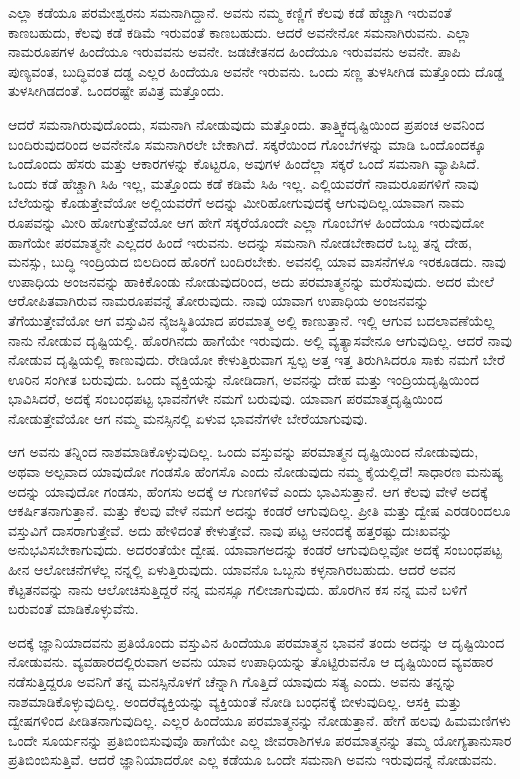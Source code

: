 ಎಲ್ಲಾ ಕಡೆಯೂ ಪರಮೇಶ್ವರನು ಸಮನಾಗಿದ್ದಾನೆ. ಅವನು ನಮ್ಮ ಕಣ್ಣಿಗೆ ಕೆಲವು ಕಡೆ ಹೆಚ್ಚಾಗಿ ಇರುವಂತೆ ಕಾಣಬಹುದು, ಕೆಲವು ಕಡೆ ಕಡಿಮೆ ಇರುವಂತೆ ಕಾಣಬಹುದು. ಆದರೆ ಅವನೇನೋ ಸಮನಾಗಿರುವನು. ಎಲ್ಲಾ ನಾಮರೂಪಗಳ ಹಿಂದೆಯೂ ಇರುವವನು ಅವನೇ. ಜಡಚೇತನದ ಹಿಂದೆಯೂ ಇರುವವನು ಅವನೇ. ಪಾಪಿ ಪುಣ್ಯವಂತ, ಬುದ್ಧಿವಂತ ದಡ್ಡ ಎಲ್ಲರ ಹಿಂದೆಯೂ ಅವನೇ ಇರುವನು. ಒಂದು ಸಣ್ಣ ತುಳಸೀಗಿಡ ಮತ್ತೊಂದು ದೊಡ್ಡ ತುಳಸೀಗಿಡದಂತೆ. ಒಂದರಷ್ಟೇ ಪವಿತ್ರ ಮತ್ತೊಂದು.

ಆದರೆ ಸಮನಾಗಿರುವುದೊಂದು, ಸಮನಾಗಿ ನೋಡುವುದು ಮತ್ತೊಂದು. ತಾತ್ತ್ವಿಕದೃಷ್ಟಿಯಿಂದ ಪ್ರಪಂಚ ಅವನಿಂದ ಬಂದಿರುವುದರಿಂದ ಅವನೇನೊ ಸಮನಾಗಿರಲೇ ಬೇಕಾಗಿದೆ. ಸಕ್ಕರೆಯಿಂದ ಗೊಂಬೆಗಳನ್ನು ಮಾಡಿ ಒಂದೊಂದಕ್ಕೂ ಒಂದೊಂದು ಹೆಸರು ಮತ್ತು ಆಕಾರಗಳನ್ನು ಕೊಟ್ಟರೂ, ಅವುಗಳ ಹಿಂದೆಲ್ಲಾ ಸಕ್ಕರೆ ಒಂದೆ ಸಮನಾಗಿ ವ್ಯಾಪಿಸಿದೆ. ಒಂದು ಕಡೆ ಹೆಚ್ಚಾಗಿ ಸಿಹಿ ಇಲ್ಲ, ಮತ್ತೊಂದು ಕಡೆ ಕಡಿಮೆ ಸಿಹಿ ಇಲ್ಲ. ಎಲ್ಲಿಯವರೆಗೆ ನಾಮರೂಪಗಳಿಗೆ ನಾವು ಬೆಲೆಯನ್ನು ಕೊಡುತ್ತೇವೆಯೋ ಅಲ್ಲಿಯವರೆಗೆ ಅದನ್ನು ಮೀರಿಹೋಗುವುದಕ್ಕೆ ಆಗುವುದಿಲ್ಲ.\break ಯಾವಾಗ ನಾಮ ರೂಪವನ್ನು ಮೀರಿ ಹೋಗುತ್ತೇವೆಯೋ ಆಗ ಹೇಗೆ ಸಕ್ಕರೆಯೊಂದೇ ಎಲ್ಲಾ ಗೊಂಬೆಗಳ ಹಿಂದೆಯೂ ಇರುವುದೋ ಹಾಗೆಯೇ ಪರಮಾತ್ಮನೇ ಎಲ್ಲದರ ಹಿಂದೆ ಇರುವನು. ಅದನ್ನು ಸಮನಾಗಿ ನೋಡಬೇಕಾದರೆ ಒಬ್ಬ ತನ್ನ ದೇಹ, ಮನಸ್ಸು, ಬುದ್ಧಿ ಇಂದ್ರಿಯದ ಬಿಲದಿಂದ ಹೊರಗೆ ಬಂದಿರಬೇಕು. ಅವನಲ್ಲಿ ಯಾವ ವಾಸನೆಗಳೂ ಇರಕೂಡದು. ನಾವು ಉಪಾಧಿಯ ಅಂಜನವನ್ನು ಹಾಕಿಕೊಂಡು ನೋಡುವುದರಿಂದ, ಅದು ಪರಮಾತ್ಮನನ್ನು ಮರೆಸುವುದು. ಅದರ ಮೇಲೆ ಆರೋಪಿತವಾಗಿರುವ ನಾಮರೂಪವನ್ನೆ ತೋರುವುದು. ನಾವು ಯಾವಾಗ ಉಪಾಧಿಯ ಅಂಜನವನ್ನು ತೆಗೆಯುತ್ತೇವೆಯೋ ಆಗ ವಸ್ತುವಿನ ನೈಜಸ್ಥಿತಿಯಾದ ಪರಮಾತ್ಮ ಅಲ್ಲಿ ಕಾಣುತ್ತಾನೆ. ಇಲ್ಲಿ ಆಗುವ ಬದಲಾವಣೆಯೆಲ್ಲ ನಾನು ನೋಡುವ ದೃಷ್ಟಿಯಲ್ಲಿ. ಹೊರಗಿನದು ಹಾಗೆಯೇ ಇರುವುದು. ಅಲ್ಲಿ ವ್ಯತ್ಯಾಸವೇನೂ ಆಗುವುದಿಲ್ಲ. ಆದರೆ ನಾವು ನೋಡುವ ದೃಷ್ಟಿಯಲ್ಲಿ ಕಾಣುವುದು. ರೇಡಿಯೋ ಕೇಳುತ್ತಿರುವಾಗ ಸ್ವಲ್ಪ ಅತ್ತ ಇತ್ತ ತಿರುಗಿಸಿದರೂ ಸಾಕು ನಮಗೆ ಬೇರೆ ಊರಿನ ಸಂಗೀತ ಬರುವುದು. ಒಂದು ವ್ಯಕ್ತಿಯನ್ನು ನೋಡಿದಾಗ, ಅವನನ್ನು ದೇಹ ಮತ್ತು ಇಂದ್ರಿಯದೃಷ್ಟಿಯಿಂದ ಭಾವಿಸಿದರೆ, ಅದಕ್ಕೆ ಸಂಬಂಧಪಟ್ಟ ಭಾವನೆಗಳೇ ನಮಗೆ ಬರುವುವು. ಯಾವಾಗ ಪರಮಾತ್ಮದೃಷ್ಟಿಯಿಂದ ನೋಡುತ್ತೇವೆಯೋ ಆಗ ನಮ್ಮ ಮನಸ್ಸಿನಲ್ಲಿ ಏಳುವ ಭಾವನೆಗಳೇ ಬೇರೆಯಾಗುವುವು.

ಆಗ ಅವನು ತನ್ನಿಂದ ನಾಶಮಾಡಿಕೊಳ್ಳುವುದಿಲ್ಲ. ಒಂದು ವಸ್ತುವನ್ನು ಪರಮಾತ್ಮನ ದೃಷ್ಟಿಯಿಂದ ನೋಡುವುದು, ಅಥವಾ ಅಲ್ಪವಾದ ಯಾವುದೋ ಗಂಡಸೊ ಹೆಂಗಸೊ ಎಂದು ನೋಡುವುದು ನಮ್ಮ ಕೈಯಲ್ಲಿದೆ! ಸಾಧಾರಣ ಮನುಷ್ಯ ಅದನ್ನು ಯಾವುದೋ ಗಂಡಸು, ಹೆಂಗಸು ಅದಕ್ಕೆ ಆ ಗುಣಗಳಿವೆ ಎಂದು ಭಾವಿಸುತ್ತಾನೆ. ಆಗ ಕೆಲವು ವೇಳೆ ಅದಕ್ಕೆ ಆಕರ್ಷಿತನಾಗುತ್ತಾನೆ. ಮತ್ತು ಕೆಲವು ವೇಳೆ ನಮಗೆ ಅದನ್ನು ಕಂಡರೆ ಆಗುವುದಿಲ್ಲ. ಪ್ರೀತಿ ಮತ್ತು ದ್ವೇಷ ಎರಡರಿಂದಲೂ ವಸ್ತುವಿಗೆ ದಾಸರಾಗುತ್ತೇವೆ. ಅದು ಹೇಳಿದಂತೆ ಕೇಳುತ್ತೇವೆ. ನಾವು ಪಟ್ಟ ಆನಂದಕ್ಕೆ ಹತ್ತರಷ್ಟು ದುಃಖವನ್ನು ಅನುಭವಿಸಬೇಕಾಗುವುದು. ಅದರಂತೆಯೇ ದ್ವೇಷ. ಯಾವಾಗ\break ಅದನ್ನು ಕಂಡರೆ ಆಗುವುದಿಲ್ಲವೋ ಅದಕ್ಕೆ ಸಂಬಂಧಪಟ್ಟ ಹೀನ ಆಲೋಚನೆಗಳೆಲ್ಲ ನನ್ನಲ್ಲಿ ಏಳುತ್ತಿರುವುದು. ಯಾವನೊ ಒಬ್ಬನು ಕಳ್ಳನಾಗಿರಬಹುದು. ಆದರೆ ಅವನ ಕೆಟ್ಟತನವನ್ನು ನಾನು ಆಲೋಚಿಸುತ್ತಿದ್ದರೆ ನನ್ನ ಮನಸ್ಸೂ ಗಲೀಜಾಗುವುದು. ಹೊರಗಿನ ಕಸ ನನ್ನ ಮನೆ ಬಳಿಗೆ ಬರುವಂತೆ ಮಾಡಿಕೊಳ್ಳುವೆನು.

ಅದಕ್ಕೆ ಜ್ಞಾನಿಯಾದವನು ಪ್ರತಿಯೊಂದು ವಸ್ತುವಿನ ಹಿಂದೆಯೂ ಪರಮಾತ್ಮನ ಭಾವನೆ ತಂದು ಅದನ್ನು ಆ ದೃಷ್ಟಿಯಿಂದ ನೋಡುವನು. ವ್ಯವಹಾರದಲ್ಲಿರುವಾಗ ಅವನು ಯಾವ ಉಪಾಧಿಯನ್ನು ತೊಟ್ಟಿರುವನೊ ಆ ದೃಷ್ಟಿಯಿಂದ ವ್ಯವಹಾರ ನಡೆಸುತ್ತಿದ್ದರೂ ಅವನಿಗೆ ತನ್ನ ಮನಸ್ಸಿನೊಳಗೆ ಚೆನ್ನಾಗಿ ಗೊತ್ತಿದೆ ಯಾವುದು ಸತ್ಯ ಎಂದು. ಅವನು ತನ್ನನ್ನು ನಾಶಮಾಡಿಕೊಳ್ಳುವುದಿಲ್ಲ. ಅಂದರೆ\break ವ್ಯಕ್ತಿಯನ್ನು ವ್ಯಕ್ತಿಯಂತೆ ನೋಡಿ ಬಂಧನಕ್ಕೆ ಬೀಳುವುದಿಲ್ಲ. ಆಸಕ್ತಿ ಮತ್ತು ದ್ವೇಷಗಳಿಂದ ಪೀಡಿತನಾಗುವುದಿಲ್ಲ. ಎಲ್ಲರ ಹಿಂದೆಯೂ ಪರಮಾತ್ಮನನ್ನು ನೋಡುತ್ತಾನೆ. ಹೇಗೆ ಹಲವು ಹಿಮಮಣಿಗಳು ಒಂದೇ ಸೂರ್ಯನನ್ನು ಪ್ರತಿಬಿಂಬಿಸುವುವೊ ಹಾಗೆಯೇ ಎಲ್ಲ ಜೀವರಾಶಿಗಳೂ ಪರಮಾತ್ಮನನ್ನು ತಮ್ಮ ಯೋಗ್ಯತಾನುಸಾರ ಪ್ರತಿಬಿಂಬಿಸುತ್ತಿವೆ. ಆದರೆ ಜ್ಞಾನಿಯಾದರೋ ಎಲ್ಲ ಕಡೆಯೂ ಒಂದೇ ಸಮನಾಗಿ ಅವನು ಇರುವುದನ್ನೆ ನೋಡುವನು.

